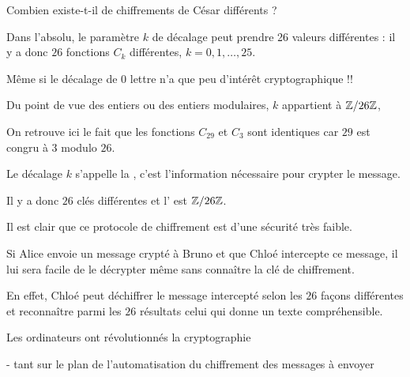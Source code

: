 % 
% 
% 

\diapo

Combien existe-t-il de chiffrements de César différents ?

\change

Dans l'absolu, le paramètre $k$ de décalage peut prendre 26 va\-leurs différentes : il y a donc $26$ fonctions $C_k$ différentes, $k=0,1,\ldots,25$. 

Même si le décalage de 0 lettre n'a que peu d'intérêt crypto\-graphique !!

\change

Du point de vue des entiers ou des entiers modulaires, $k$ appartient à $\mathbb{Z} / 26 \mathbb{Z}$, 

\change

On retrouve ici le fait que les fonctions $C_{29}$ et $C_3$ sont identiques car $29$ est congru à $3$ modulo $26$.

\change

Le décalage $k$ s'appelle la , c'est l'information nécessaire pour crypter le message.

\change

Il y a donc $26$ clés différentes et l' est
$\mathbb{Z}/26\mathbb{Z}$.


\change

Il est clair que ce protocole de chiffrement est d'une sécurité très faible.


Si Alice envoie un message crypté à Bruno et que Chloé intercepte ce message, 
il lui sera facile de le décrypter même sans connaître la clé de chiffrement.

En effet, Chloé peut déchiffrer le message intercepté selon les $26$ façons différentes et reconnaître parmi 
les $26$ résultats celui qui donne un texte compréhensible. 



\diapo

Les ordinateurs ont révolutionnés la cryptographie 

- tant sur le plan de l'automatisation du chiffrement des messages à envoyer 

